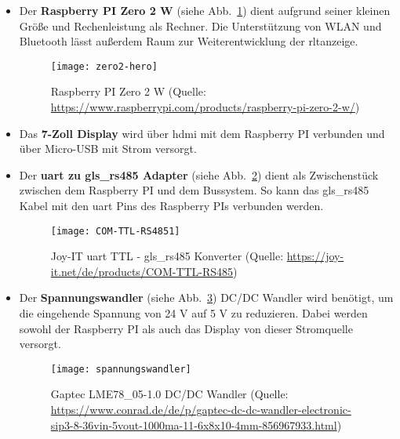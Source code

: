 \begin{itemize}
    \item Der \textbf{Raspberry PI Zero 2 W} (siehe Abb.~\ref{fig:zero_2_w}) dient aufgrund seiner kleinen Größe und Rechenleistung als Rechner. Die Unterstützung von WLAN und Bluetooth lässt außerdem Raum zur Weiterentwicklung der \ac{rltanzeige}.
    \begin{figure}[H]
        \centering
        \texttt{[image: zero2-hero]}
        \caption{Raspberry PI Zero 2 W (Quelle: \url{https://www.raspberrypi.com/products/raspberry-pi-zero-2-w/}) \label{fig:zero_2_w}}
    \end{figure}
    
    \item Das \textbf{7-Zoll Display} wird über \ac{hdmi} mit dem Raspberry PI verbunden und über Micro-USB mit Strom versorgt.

    \item Der \textbf{\ac{uart} zu \gls{gls_rs485} Adapter} (siehe Abb.~\ref{fig:ttl_rs485_adapter}) dient als Zwischenstück zwischen dem Raspberry PI und dem Bussystem. So kann das \gls{gls_rs485} Kabel mit den \ac{uart} Pins des Raspberry PIs verbunden werden.
    \begin{figure}[H]
        \centering
        \texttt{[image: COM-TTL-RS4851]}
        \caption{Joy-IT \ac{uart} TTL - \gls{gls_rs485} Konverter (Quelle: \url{https://joy-it.net/de/products/COM-TTL-RS485}) \label{fig:ttl_rs485_adapter}}
    \end{figure}

    \item Der \textbf{Spannungswandler} (siehe Abb.~\ref{fig:spannungswandler}) \bzw DC/DC Wandler wird benötigt, um die eingehende Spannung von 24 V auf 5 V zu reduzieren. Dabei werden sowohl der Raspberry PI als auch das Display von dieser Stromquelle versorgt.
    \begin{figure}[H]
        \centering
        \texttt{[image: spannungswandler]}
        \caption{Gaptec LME78\_05-1.0 DC/DC Wandler (Quelle: \url{https://www.conrad.de/de/p/gaptec-dc-dc-wandler-electronic-sip3-8-36vin-5vout-1000ma-11-6x8x10-4mm-856967933.html}) \label{fig:spannungswandler}}
    \end{figure}
\end{itemize}